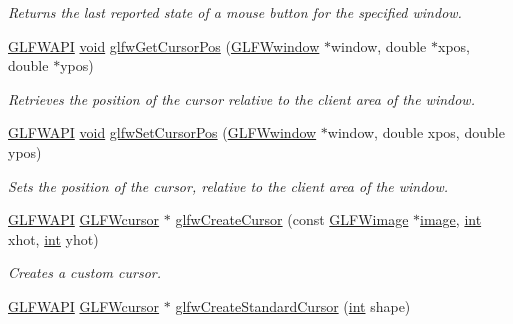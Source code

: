 \begin{DoxyCompactItemize}
\begin{DoxyCompactList}\small\item\em Returns the last reported state of a mouse button for the specified window. \end{DoxyCompactList}\item 
\hyperlink{glfw3_8h_a56da5036b2cc259351ae22fd6439bb47}{G\+L\+F\+W\+A\+P\+I} \hyperlink{wglew_8h_aeea6e3dfae3acf232096f57d2d57f084}{void} \hyperlink{group__input_gad289438eb7cf53d11eca685373f44105}{glfw\+Get\+Cursor\+Pos} (\hyperlink{group__window_ga3c96d80d363e67d13a41b5d1821f3242}{G\+L\+F\+Wwindow} $\ast$window, double $\ast$xpos, double $\ast$ypos)
\begin{DoxyCompactList}\small\item\em Retrieves the position of the cursor relative to the client area of the window. \end{DoxyCompactList}\item 
\hyperlink{glfw3_8h_a56da5036b2cc259351ae22fd6439bb47}{G\+L\+F\+W\+A\+P\+I} \hyperlink{wglew_8h_aeea6e3dfae3acf232096f57d2d57f084}{void} \hyperlink{group__input_gaaf152cc93418acb0ba342e3f4af922bc}{glfw\+Set\+Cursor\+Pos} (\hyperlink{group__window_ga3c96d80d363e67d13a41b5d1821f3242}{G\+L\+F\+Wwindow} $\ast$window, double xpos, double ypos)
\begin{DoxyCompactList}\small\item\em Sets the position of the cursor, relative to the client area of the window. \end{DoxyCompactList}\item 
\hyperlink{glfw3_8h_a56da5036b2cc259351ae22fd6439bb47}{G\+L\+F\+W\+A\+P\+I} \hyperlink{glfw3_8h_a89261ae18c75e863aaf2656ecdd238f4}{G\+L\+F\+Wcursor} $\ast$ \hyperlink{group__input_gac0f0f691f2d110f9acfb4bfe07f1216c}{glfw\+Create\+Cursor} (const \hyperlink{struct_g_l_f_wimage}{G\+L\+F\+Wimage} $\ast$\hyperlink{glew_8h_afee73cc3a067f1a92ff8b87391c73cb2}{image}, \hyperlink{wglew_8h_a500a82aecba06f4550f6849b8099ca21}{int} xhot, \hyperlink{wglew_8h_a500a82aecba06f4550f6849b8099ca21}{int} yhot)
\begin{DoxyCompactList}\small\item\em Creates a custom cursor. \end{DoxyCompactList}\item 
\hyperlink{glfw3_8h_a56da5036b2cc259351ae22fd6439bb47}{G\+L\+F\+W\+A\+P\+I} \hyperlink{glfw3_8h_a89261ae18c75e863aaf2656ecdd238f4}{G\+L\+F\+Wcursor} $\ast$ \hyperlink{group__input_ga969dd87ad2ddbf3e1086cc40f235eed1}{glfw\+Create\+Standard\+Cursor} (\hyperlink{wglew_8h_a500a82aecba06f4550f6849b8099ca21}{int} shape)

\end{DoxyCompactItemize}
